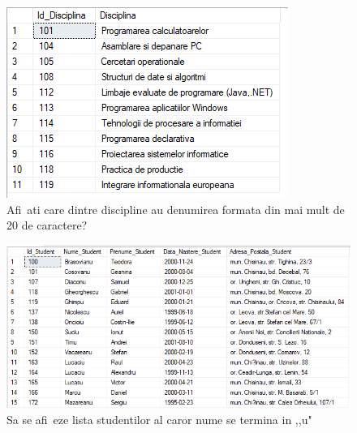 \documentclass[12pt]{article}
\begin{document}
        
        \begin{figure}[H]
                \centering
                \includegraphics[width=.95\textwidth]{img4.png}
                \caption{Afi~ati care dintre discipline au denumirea formata din mai mult de 20 de caractere? }
        \end{figure}
        \vspace{0.5 cm}

        \begin{figure}[H]
                \centering
                \includegraphics[width=.95\textwidth]{img5.png}
                \caption{Sa se afi~eze lista studentilor al caror nume se termina in ,,u" }
        \end{figure}
        \vspace{0.5 cm}
\end{document}
